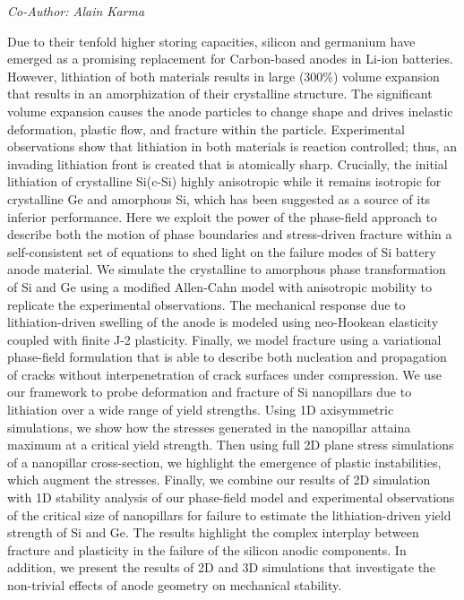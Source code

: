 \begin{center}
\textit{Co-Author: Alain Karma}
\end{center} 
Due to their tenfold higher storing capacities, silicon and germanium have emerged as a promising replacement for Carbon-based anodes in Li-ion batteries. However, lithiation of both materials results in large (300\%) volume expansion that results in an amorphization of their crystalline structure. The significant volume expansion causes the anode particles to change shape and drives inelastic deformation, plastic flow, and fracture within the particle. Experimental observations show that lithiation in both materials is reaction controlled; thus, an invading lithiation front is created that is atomically sharp. Crucially, the initial lithiation of crystalline Si(c-Si) highly anisotropic while it remains isotropic for crystalline Ge and amorphous Si, which has been suggested as a source of its inferior performance. Here we exploit the power of the phase-field approach to describe both the motion of phase boundaries and stress-driven fracture within a self-consistent set of equations to shed light on the failure modes of Si battery anode material. We simulate the crystalline to amorphous phase transformation of Si and Ge using a modified Allen-Cahn model with anisotropic mobility to replicate the experimental observations. The mechanical response due to lithiation-driven swelling of the anode is modeled using neo-Hookean elasticity coupled with finite J-2 plasticity. Finally, we model fracture using a variational phase-field formulation that is able to describe both nucleation and propagation of cracks without interpenetration of crack surfaces under compression. We use our framework to probe deformation and fracture of Si nanopillars due to lithiation over a wide range of yield strengths. Using 1D axisymmetric simulations, we show how the stresses generated in the nanopillar attaina maximum at a critical yield strength. Then using full 2D plane stress simulations of a nanopillar cross-section, we highlight the emergence of plastic instabilities, which augment the stresses. Finally, we combine our results of 2D simulation with 1D stability analysis of our phase-field model and experimental observations of the critical size of nanopillars for failure to estimate the lithiation-driven yield strength of Si and Ge. The results highlight the complex interplay between fracture and plasticity in the failure of the silicon anodic components. In addition, we present the results of 2D and 3D simulations that investigate the non-trivial effects of anode geometry on mechanical stability.

